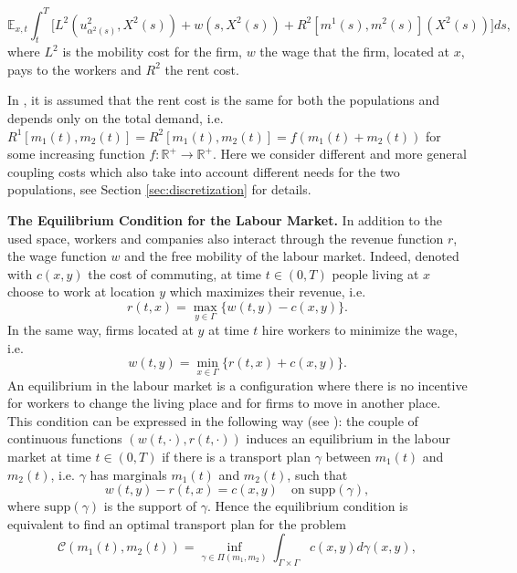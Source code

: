 \documentclass[smallextended,referee,envcountsect,]{svjour3}
\newcommand{\R}{{\mathbb{R}}}
\newcommand{\lra}{\longrightarrow}
\newcommand{\G}{\Gamma}
\newcommand{\cC}{{\mathcal C}}
\newcommand{\supp}{\mathrm{supp}}
\begin{document}
$$
\mathbb{E}_{x,t}\int_t^T \Big[ L^2(u^2_{\alpha^2(s)}, X^2(s))+w(s,X^2(s))+R^2[m^1(s),m^2(s)](X^2(s))\Big]ds,
$$
where $L^2$ is the mobility cost for the firm, $w$ the wage that the firm, located at $x$, pays to the workers and $R^2$ the rent cost.
\begin{remark}
In \cite{barilla}, it is assumed that the rent cost is the same for both the populations and depends only on the total demand,  i.e. $R^1[m_1(t),m_2(t)]=R^2[m_1(t),m_2(t)]=f(m_1(t)+m_2(t))$ for some increasing function $f:\R^+\lra\R^+$. Here we  consider different and more general coupling costs which also take into account different needs for the two populations, see Section \ref{sec:discretization} for details.
\end{remark}
\par\noindent\textbf{The Equilibrium Condition for the Labour Market.}
In addition to the used space, workers and companies also interact through the revenue function $r$, the wage function $w$ and the free mobility of the labour market. Indeed, denoted with $c(x,y)$ the cost of commuting, at time $t\in(0, T)$ people living at $x$ choose to work at location $y$ which maximizes their revenue, i.e.
\begin{equation}\label{revenue}
r(t,x)=\max_{y\in\G}\{w(t,y)-c(x,y)\}.
\end{equation}
In the same way, firms located at $y$ at time $t$ hire workers to minimize the wage, i.e.
\begin{equation}\label{wage}
w(t,y)=\min_{x\in\G}\{r(t,x)+c(x,y)\}.
\end{equation}
An equilibrium in the labour market is a configuration where there is no incentive for workers to change the living place and for firms to move in another place. This condition can be expressed   in the following way (see \cite{barilla}): the couple of continuous functions $(w(t,\cdot), r(t,\cdot))$ induces an equilibrium in the labour market at time $t\in (0,T)$ if there is a transport plan $\gamma$ between $m_1(t)$ and $m_2(t)$, i.e. $\gamma$ has marginals $m_1(t)$ and $m_2(t)$, such that  
\begin{equation}\label{equilibrium}
	w(t, y)-r(t, x)=c(x, y) \quad\text{on $\supp(\gamma)$},
\end{equation}
where $\supp(\gamma)$ is the support of $\gamma$. Hence  the equilibrium condition is equivalent to find an    optimal  transport  plan for  the   problem 
\begin{equation}\label{OT_primal}
	 \cC(m_1(t), m_2(t))=\inf_{\gamma\in\Pi(m_1, m_2)}\int_{\Gamma\times\Gamma}c(x, y)d\gamma(x, y),
\end{equation}
\end{document}
